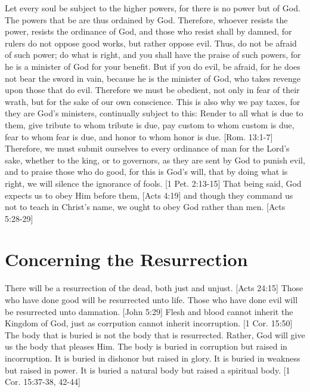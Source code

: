 \documentclass[../main.tex]{subfiles}
\begin{document}
	Let every soul be subject to the higher powers, for there is no power but of God. The powers that be are thus ordained by God. Therefore, whoever resists the power, resists the ordinance of God, and those who resist shall by damned, for rulers do not oppose good works, but rather oppose evil. Thus, do not be afraid of such power; do what is right, and you shall have the praise of such powers, for he is a minister of God for your benefit. But if you do evil, be afraid, for he does not bear the sword in vain, because he is the minister of God, who takes revenge upon those that do evil. Therefore we must be obedient, not only in fear of their wrath, but for the sake of our own conscience. This is also why we pay taxes, for they are God's ministers, continually subject to this: Render to all what is due to them, give tribute to whom tribute is due, pay custom to whom custom is due, fear to whom fear is due, and honor to whom honor is due. [Rom. 13:1-7] Therefore, we must submit ourselves to every ordinance of man for the Lord's sake, whether to the king, or to governors, as they are sent by God to punish evil, and to praise those who do good, for this is God's will, that by doing what is right, we will silence the ignorance of fools. [1 Pet. 2:13-15] That being said, God expects us to obey Him before them, [Acts 4:19] and though they command us not to teach in Christ's name, we ought to obey God rather than men. [Acts 5:28-29]

	\section{Concerning the Resurrection}

	There will be a resurrection of the dead, both just and unjust. [Acts 24:15] Those who have done good will be resurrected unto life. Those who have done evil will be resurrected unto damnation. [John 5:29] Flesh and blood cannot inherit the Kingdom of God, just as corrpution cannot inherit incorruption. [1 Cor. 15:50] The body that is buried is not the body that is resurrected. Rather, God will give us the body that pleases Him. The body is buried in corruption but raised in incorruption. It is buried in dishonor but raised in glory. It is buried in weakness but raised in power. It is buried a natural body but raised a spiritual body. [1 Cor. 15:37-38, 42-44]



	\theendnotes
	\setcounter{endnote}{0}



	
\end{document}
